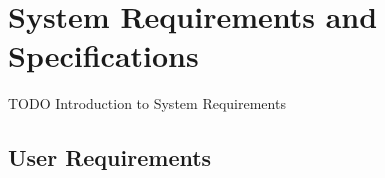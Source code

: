 \documentclass[../MasterThesis.tex]{subfiles}
\begin{document}
	
	
	

%
%
%
%
%
%
%
%
\newpage
\section{System Requirements and Specifications} \label{section:systemrequirementsandspecifications}

TODO Introduction to System Requirements




\subsection{User Requirements} \label{subsection:userrequirements}









\end{document}
